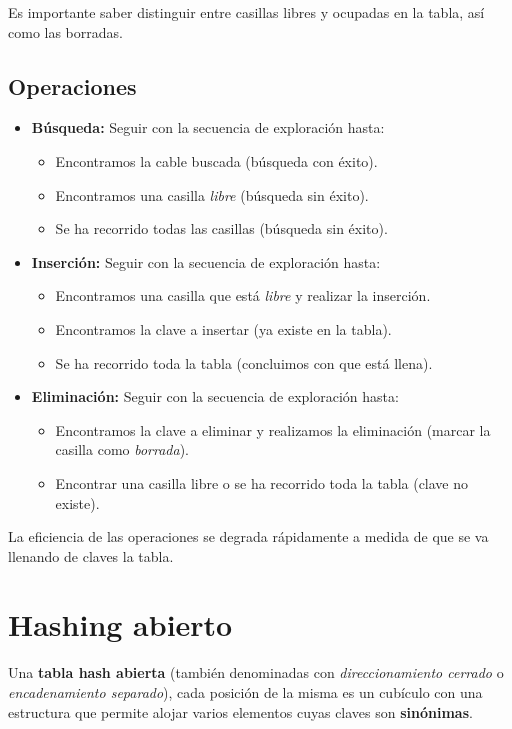 Es importante saber distinguir entre casillas libres y ocupadas en la tabla, así como las borradas.

\subsection*{Operaciones}
\begin{itemize}
  \item \textbf{Búsqueda:} Seguir con la secuencia de exploración hasta:
  \begin{itemize}
    \item Encontramos la cable buscada (búsqueda con éxito).
    \item Encontramos una casilla \textit{libre} (búsqueda sin éxito).
    \item Se ha recorrido todas las casillas (búsqueda sin éxito).
  \end{itemize}
  \item \textbf{Inserción:} Seguir con la secuencia de exploración hasta:
  \begin{itemize}
    \item Encontramos una casilla que está \textit{libre} y realizar la inserción.
    \item Encontramos la clave a insertar (ya existe en la tabla).
    \item Se ha recorrido toda la tabla (concluimos con que está llena).
  \end{itemize}
  \item \textbf{Eliminación:} Seguir con la secuencia de exploración hasta:
  \begin{itemize}
    \item Encontramos la clave a eliminar y realizamos la eliminación (marcar la casilla como \textit{borrada}).
    \item Encontrar una casilla libre o se ha recorrido toda la tabla (clave no existe).
  \end{itemize}
\end{itemize}
La eficiencia de las operaciones se degrada rápidamente a medida de que se va llenando de claves la tabla.
\newpage
\section{Hashing abierto}
Una \textbf{tabla hash abierta} (también denominadas con \textit{direccionamiento cerrado} o \textit{encadenamiento separado}), cada posición de la misma es un cubículo con una estructura que permite alojar varios elementos cuyas claves son \textbf{sinónimas}.

